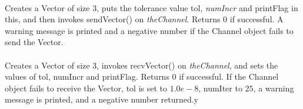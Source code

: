 \\ 
Creates a Vector of size 3, puts the tolerance value \p tol, {\em
numIncr} and \p printFlag
in this, and then invokes sendVector() on {\em
theChannel}. Returns $0$ if successful. A warning message is printed
and a negative number if the Channel object fails to send the Vector.\\ 

\\ 
Creates a Vector of size 3, invokes recvVector() on {\em
theChannel}, and sets the values of \p tol, \p numIncr and \p printFlag.
Returns $0$ if successful. If the Channel object fails to receive the
Vector, \p tol is set to $1.0e-8$, \p numIter to $25$, a warning
message is printed, and a negative number returned.y




